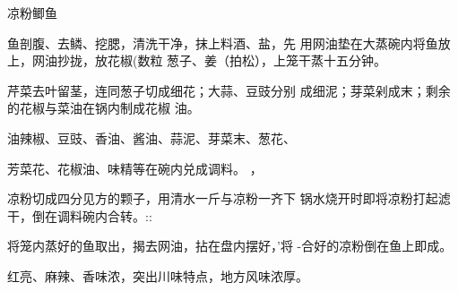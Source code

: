 \begin{recipe}{凉粉鲫鱼}

\ingredients


\cooking

\step 鱼剖腹、去鳞、挖腮，清洗干净，抹上料酒、盐，先 用网油垫在大蒸碗内将鱼放上，网油抄拢，放花椒(数粒 葱子、姜（拍松），上笼干蒸十五分钟。

\step 芹菜去叶留茎，连同葱子切成细花；大蒜、豆豉分别 成细泥；芽菜剁成末；剩余的花椒与菜油在锅内制成花椒
油。

\step 油辣椒、豆豉、香油、酱油、蒜泥、芽菜末、葱花、

芳菜花、花椒油、味精等在碗内兑成调料。	，

\step 凉粉切成四分见方的颗子，用清水一斤与凉粉一齐下 锅水烧开时即将凉粉打起滤干，倒在调料碗内合转。::

\step 将笼内蒸好的鱼取出，揭去网油，拈在盘内摆好，’将 -合好的凉粉倒在鱼上即成。

\notes

红亮、麻辣、香味浓，突出川味特点，地方风味浓厚。

\end{recipe}

